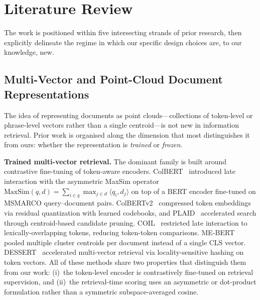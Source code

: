 \documentclass[review,1p]{elsarticle}
\begin{document}
\section{Literature Review}
\label{sec:related}

The work is positioned within five intersecting strands of prior research, then explicitly delineate the regime in which our specific design choices are, to our knowledge, new.

\subsection{Multi-Vector and Point-Cloud Document Representations}
\label{subsec:related-multivec}

The idea of representing documents as point clouds---collections of token-level or phrase-level vectors rather than a single centroid---is not new in information retrieval. Prior work is organised along the dimension that most distinguishes it from ours: whether the representation is \emph{trained} or \emph{frozen}.

\textbf{Trained multi-vector retrieval.} The dominant family is built around contrastive fine-tuning of token-aware encoders. ColBERT~\citep{khattab2020colbert} introduced late interaction with the asymmetric MaxSim operator $\mathrm{MaxSim}(q, d) = \sum_{i \in q} \max_{j \in d} \langle q_i, d_j\rangle$ on top of a BERT encoder fine-tuned on MSMARCO query--document pairs. ColBERTv2~\citep{santhanam2022colbertv2} compressed token embeddings via residual quantization with learned codebooks, and PLAID~\citep{santhanam2022plaid} accelerated search through centroid-based candidate pruning. COIL~\citep{gao2021coil} restricted late interaction to lexically-overlapping tokens, reducing token-token comparisons. ME-BERT~\citep{luan2021mebert} pooled multiple cluster centroids per document instead of a single CLS vector. DESSERT~\citep{engels2024dessert} accelerated multi-vector retrieval via locality-sensitive hashing on token vectors. All of these methods share two properties that distinguish them from our work: (i)~the token-level encoder is contrastively fine-tuned on retrieval supervision, and (ii)~the retrieval-time scoring uses an asymmetric or dot-product formulation rather than a symmetric subspace-averaged cosine.
\end{document}
